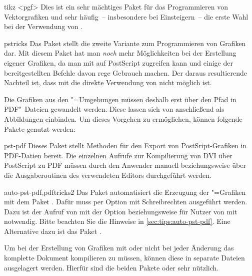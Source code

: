 \begin{packages}
\item[tikz]<pgf>
  Dies ist ein sehr mächtiges Paket für das Programmieren von Vektorgrafiken 
  und sehr häufig~-- insbesondere bei Einsteigern~-- die erste Wahl bei der 
  Verwendung von .
\item[pstricks]
  Das Paket  stellt die zweite Variante zum Programmieren 
  von Grafiken dar. Mit diesem Paket hat man \emph{noch} mehr Möglichkeiten bei 
  der Erstellung eigener Grafiken, da man mit  auf 
  PostScript zugreifen kann und einige der bereitgestellten Befehle davon rege 
  Gebrauch machen. Der daraus resultierende Nachteil ist, dass mit 
   die direkte Verwendung von  nicht 
  möglich ist.
  
  Die Grafiken aus den "=Umgebungen müssen deshalb erst 
  über den Pfad 
  in PDF"~Dateien gewandelt werden. Diese lassen sich von  
  anschließend als Abbildungen einbinden. Um dieses Vorgehen zu ermöglichen, 
  können folgende Pakete genutzt werden:
  \begin{packages}
  \item[pst-pdf]
    Dieses Paket stellt Methoden für den Export von PostSript-Grafiken in 
    PDF-Datien bereit. Die einzelnen Aufrufe zur Kompilierung von DVI über 
    PostScript zu PDF müssen durch den Anwender manuell beziehungsweise über 
    die Ausgaberoutinen des verwendeten Editors durchgeführt werden.
  \item[auto-pst-pdf,pdftricks2]
    Das Paket automatisiert die Erzeugung der "=Grafiken mit 
    dem Paket . Dafür muss  per Option mit 
    Schreibrechten ausgeführt werden. Dazu ist der Aufruf von  
    mit der Option  beziehungsweise für Nutzer von 
     mit  notwendig. 
    Bitte beachten Sie die Hinweise in \autoref{sec:tips:auto-pst-pdf}. Eine 
    Alternative dazu ist das Paket .
  \end{packages}
\end{packages}
%
Um bei der Erstellung von Grafiken mit  oder  
nicht bei jeder Änderung das komplette Dokument kompilieren zu müssen, können 
diese in separate Dateien ausgelagert werden. Hierfür sind die beiden Pakete 
 oder  sehr nützlich.

